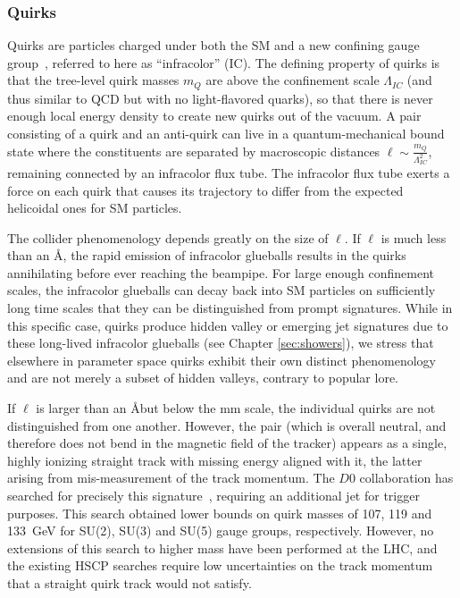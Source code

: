 \subsubsection*{Quirks}

Quirks are particles charged under both the SM and a new confining gauge group~\cite{Kang:2008ea}, referred to here as ``infracolor'' (IC). The defining property of quirks is that the tree-level quirk masses $m_Q$ are above the confinement scale $\Lambda_{IC}$ (and thus similar to QCD but with no light-flavored quarks), so that there is never enough local energy density to create new quirks out of the vacuum. A pair consisting of a quirk and an anti-quirk can live in a quantum-mechanical bound state where the constituents are separated by macroscopic distances $\ell \sim \frac{m_Q}{\Lambda_{IC}^2}$, remaining connected by an infracolor flux tube. The infracolor flux tube exerts a force on each quirk that causes its trajectory to differ from the expected helicoidal ones for SM particles. 

The collider phenomenology depends greatly on the size of $\ell$.  If $\ell$ is much less than an \AA, the rapid emission of infracolor glueballs results in the quirks annihilating before ever reaching the beampipe.  For large enough confinement scales, the infracolor glueballs can decay back into SM particles on sufficiently long time scales that they can be distinguished from prompt signatures.  While in this specific case, quirks produce hidden valley \cite{Strassler:2006im} or emerging jet \cite{Schwaller:2015gea} signatures due to these long-lived infracolor glueballs (see Chapter \ref{sec:showers}), we stress that elsewhere in parameter space quirks exhibit their own distinct phenomenology and are not merely a subset of hidden valleys, contrary to popular lore.

If $\ell$ is larger than an \AA but below the mm scale, the individual quirks are not distinguished from one another. However, the pair (which is overall neutral, and therefore does not bend in the magnetic field of the tracker) appears as a single, highly ionizing straight track with missing energy aligned with it, the latter arising from mis-measurement of the track momentum. The $D0$ collaboration has searched for precisely this signature~\cite{Abazov:2010yb}, requiring an additional jet for trigger purposes. This search obtained lower bounds on quirk masses of 107, 119 and 133~GeV for SU(2), SU(3) and SU(5) gauge groups, respectively. However, no extensions of this search to higher mass have been performed at the LHC, and the existing HSCP searches require low uncertainties on the track momentum that a straight quirk track would not satisfy.

